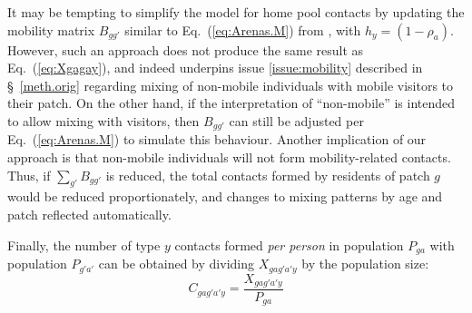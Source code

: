 It may be tempting to simplify the model for home pool contacts by
updating the mobility matrix $B_{gg'}$ similar to Eq.~(\ref{eq:Arenas.M}) from \cite{Arenas2020},
with $h_y = (1-\rho_a)$.
However, such an approach does not produce the same result as Eq.~(\ref{eq:Xgagay}),
and indeed underpins issue \ref{issue:mobility} described in \S~\ref{meth.orig}
regarding mixing of non-mobile individuals with mobile visitors to their patch.
On the other hand, if the interpretation of ``non-mobile'' is intended to allow mixing with visitors,
then $B_{gg'}$ can still be adjusted per Eq.~(\ref{eq:Arenas.M}) to simulate this behaviour.
Another implication of our approach is that
non-mobile individuals will not form mobility-related contacts.
Thus, if $\sum_{g'} B_{gg'}$ is reduced,
the total contacts formed by residents of patch $g$ would be reduced proportionately,
and changes to mixing patterns by age and patch reflected automatically.
\par
Finally, the number of type $y$ contacts formed \textit{per person}
in population $P_{ga}$ with population $P_{g'a'}$ can be obtained by
dividing $X_{gag'a'y}$ by the population size:
\begin{equation}\label{eq:Cgagay}
  C_{gag'a'y} = \frac{X_{gag'a'y}}{P_{ga}}
\end{equation}